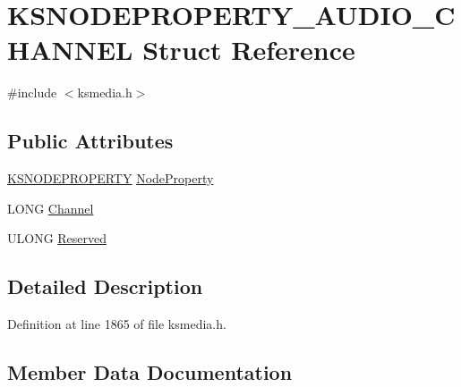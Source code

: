 \hypertarget{struct_k_s_n_o_d_e_p_r_o_p_e_r_t_y___a_u_d_i_o___c_h_a_n_n_e_l}{}\section{K\+S\+N\+O\+D\+E\+P\+R\+O\+P\+E\+R\+T\+Y\+\_\+\+A\+U\+D\+I\+O\+\_\+\+C\+H\+A\+N\+N\+EL Struct Reference}
\label{struct_k_s_n_o_d_e_p_r_o_p_e_r_t_y___a_u_d_i_o___c_h_a_n_n_e_l}


{\ttfamily \#include $<$ksmedia.\+h$>$}

\subsection*{Public Attributes}
\begin{DoxyCompactItemize}
\item 
\hyperlink{struct_k_s_n_o_d_e_p_r_o_p_e_r_t_y}{K\+S\+N\+O\+D\+E\+P\+R\+O\+P\+E\+R\+TY} \hyperlink{struct_k_s_n_o_d_e_p_r_o_p_e_r_t_y___a_u_d_i_o___c_h_a_n_n_e_l_afc8bfc6926521ae3fefa896c8a5db9ce}{Node\+Property}
\item 
L\+O\+NG \hyperlink{struct_k_s_n_o_d_e_p_r_o_p_e_r_t_y___a_u_d_i_o___c_h_a_n_n_e_l_ae6f4dbb2f5aa1e12e7e233caefdc1510}{Channel}
\item 
U\+L\+O\+NG \hyperlink{struct_k_s_n_o_d_e_p_r_o_p_e_r_t_y___a_u_d_i_o___c_h_a_n_n_e_l_a2162c15f91e6623bd9cd166c5c4b3ccf}{Reserved}
\end{DoxyCompactItemize}


\subsection{Detailed Description}


Definition at line 1865 of file ksmedia.\+h.



\subsection{Member Data Documentation}
